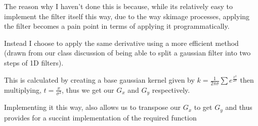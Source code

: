 \documentclass[11pt]{article}
\begin{document}
The reason why I haven't done this is because, while its relatively easy
to implement the filter itself this way, due to the way skimage
processes, applying the filter becomes a pain point in terms of applying
it programmatically.

    Instead I choose to apply the same derivative using a more efficient
method (drawn from our class discussion of being able to split a
gaussian filter into two steps of 1D filters).

This is calculated by creating a base gaussian kernel given by
\(k = \frac{1}{2\pi\sigma}\sum e^{\frac{x^2}{2\sigma}}\) then
multiplying, \(t = \frac{x}{\sigma^2}\), thus we get our \(G_x\) and
\(G_y\) respectively.

Implementing it this way, also allows us to transpose our \(G_x\) to get
\(G_y\) and thus provides for a succint implementation of the required
function
\end{document}
